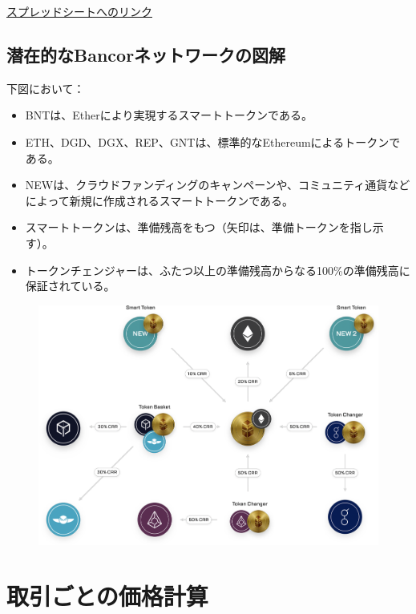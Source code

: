 \documentclass{jsarticle}
\begin{document}
  \href{https://goo.gl/3hR6e8}{スプレッドシートへのリンク}

  \subsection{潜在的なBancorネットワークの図解}

  下図において：

  \begin{itemize}
    \item BNTは、Etherにより実現するスマートトークンである。
    \item ETH、DGD、DGX、REP、GNTは、標準的なEthereumによるトークンである。
    \item NEWは、クラウドファンディングのキャンペーンや、コミュニティ通貨などによって新規に作成されるスマートトークンである。
    \item スマートトークンは、準備残高をもつ（矢印は、準備トークンを指し示す）。  
    \item トークンチェンジャーは、ふたつ以上の準備残高からなる100\%の準備残高に保証されている。
  \end{itemize}

  \begin{figure}[h]
   \begin{center}
    \includegraphics{fig5.png}
   \end{center}
  \end{figure}

\section{取引ごとの価格計算}
\end{document}
